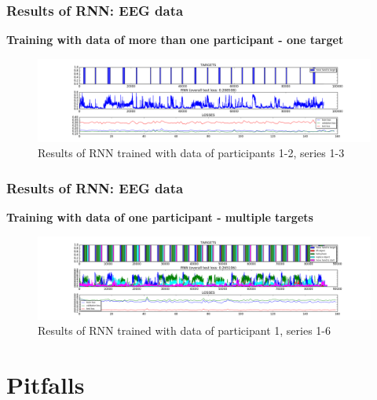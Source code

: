 \documentclass{beamer}
\begin{document}
\begin{frame}
	\frametitle{Results of RNN: EEG data}
	\textbf{Training with data of more than one participant - one target}
	\begin{figure}[ht]
		\centering
		\includegraphics[width=1.0\textwidth,trim={5cm 0cm 5cm 0cm},clip]{images/200_50_[1,2]_[1,2,3]_0_150_1_1469542956_eeg_test.png}
		\caption{Results of RNN trained with data of participants 1-2, series 1-3}

	\end{figure}
\end{frame}

\begin{frame}
	\frametitle{Results of RNN: EEG data}
	\textbf{Training with data of one participant - multiple targets}
	\begin{figure}[ht]
		\centering
		\includegraphics[width=1.0\textwidth,trim={5cm 0cm 5cm 0cm},clip]{images/200_50_[1]_[1,2,3,4,5,6]_0_150_1_1469560909_eeg_test.png}
		\caption{Results of RNN trained with data of participant 1, series 1-6}

	\end{figure}
\end{frame}

\section{Pitfalls}
\end{document}
